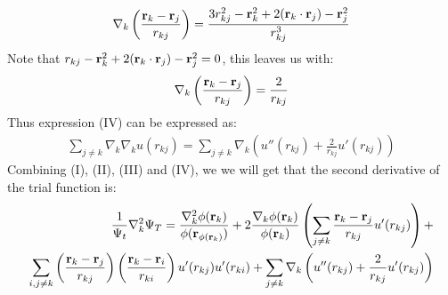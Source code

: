 \documentclass[a4paper, 10pt]{article}
\begin{document}
\begin{appendices}
\begin{align}
		\nabla_{k}
		\left(\frac{\bold{r}_{k} - \bold{r}_{j}}{r_{kj}}\right)
		= \frac{3r_{kj}^2 - \bold{r}^2_{k} + 2(\bold{r}_{k}\cdot \bold{r}_{j}) - \bold{r}^2_{j}}{r_{kj}^3}
		\end{align}
		Note that $r_{kj} - \bold{r}^2_{k} + 2(\bold{r}_{k}\cdot \bold{r}_{j}) - \bold{r}^2_{j} = 0$, this leaves us with:
		\begin{align}
		\nabla_{k}
		\left(\frac{\bold{r}_{k} - \bold{r}_{j}}{r_{kj}}\right)
		= \frac{2}{r_{kj}}
		\end{align}
		Thus expression (IV) can be expressed as:
		\begin{align}
		\sum_{j \neq k}\nabla_{k}\nabla_{k}u(r_{kj}) =
		\sum_{j \neq k}\nabla_{k}\left(u''(r_{kj}) + \frac{2}{r_{kj}}u'(r_{kj})
		\right)
		\end{align}
		Combining (I), (II), (III) and (IV), we we will get that the second derivative
		of the trial function is:
		\begin{align}
		\begin{split}
		\frac{1}{\Psi_{t}}\nabla_{k}^2\Psi_{T} =
		\frac{\nabla_{k}^2\phi{(\bold{r}_{k})}}{\phi(\bold{r}_{\phi(\bold{r}_{k})})}
		+
		2\frac{\nabla_{k}\phi(\bold{r}_{k})}{\phi{(\bold{r}_{k})}}\left(\sum_{j\neq k}\frac{\bold{r}_{k} - \bold{r}_{j}}{r_{kj}}u'(r_{kj})\right)
		+\\
		\sum_{i, j\neq k}\left(\frac{\bold{r}_{k} - \bold{r}_{j}}{r_{kj}}\right)
		\left(\frac{\bold{r}_{k} - \bold{r}_{i}}{r_{ki}}\right)u'(r_{kj})u'(r_{ki})
		+
		\sum_{j \neq k}\nabla_{k}\left(u''(r_{kj}) + \frac{2}{r_{kj}}u'(r_{kj})\right)
		\end{split}
		\end{align}

\end{appendices}
\end{document}
